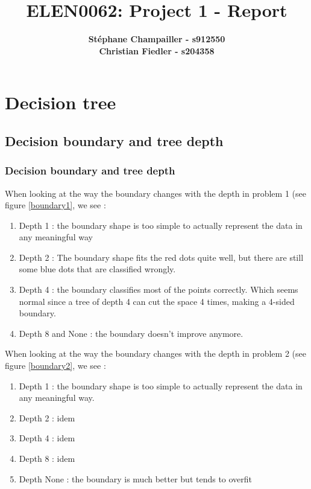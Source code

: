 \documentclass{article}
\begin{document}

\title{\Large{ELEN0062: Project 1 - Report}}
\vspace{1cm}
\author{\small{\bf Stéphane Champailler - s912550 } \\ \small{\bf Christian Fiedler - s204358}}



\maketitle


\def\picwidth{8cm}

\section{Decision tree}
\subsection{Decision boundary and tree depth}
\subsubsection{Decision boundary and tree depth}

When looking at the way the boundary changes with the depth in problem 1 (see figure \ref{boundary1}, we see :
\begin{enumerate}
\item Depth 1 : the boundary shape is too simple to actually represent the data in any meaningful way
\item Depth 2 : The boundary shape fits the red dots quite well, but there are still some blue dots that are classified wrongly.
\item Depth 4 : the boundary classifies most of the points correctly. Which seems normal since a tree of depth 4 can cut the space 4 times, making a 4-sided boundary.
\item Depth 8 and None : the boundary doesn't improve anymore.
\end{enumerate}


When looking at the way the boundary changes with the depth in problem 2 (see figure \ref{boundary2}, we see :
\begin{enumerate}
\item Depth 1 : the boundary shape is too simple to actually represent the data in any meaningful way.
\item Depth 2 : idem
\item Depth 4 : idem
\item Depth 8 : idem
\item Depth None : the boundary is much better but tends to overfit
\end{enumerate}
\end{document}
